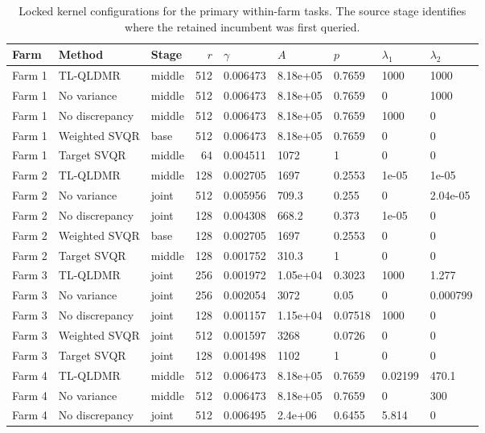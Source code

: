 \begin{table}[pos=t,width=\FullWidth]
\centering
\color{blue}
\caption{Locked kernel configurations for the primary within-farm tasks. The source stage identifies where the retained incumbent was first queried.}
\label{tab:selection-v2-within-kernel-configs}
\small
\setlength{\tabcolsep}{3pt}
\begin{tabular}{lllrlllll}
\toprule
Farm & Method & Stage & $r$ & $\gamma$ & $A$ & $p$ & $\lambda_1$ & $\lambda_2$ \\
\midrule
Farm 1 & TL-QLDMR & middle & 512 & 0.006473 & 8.18e+05 & 0.7659 & 1000 & 1000 \\
Farm 1 & No variance & middle & 512 & 0.006473 & 8.18e+05 & 0.7659 & 0 & 1000 \\
Farm 1 & No discrepancy & middle & 512 & 0.006473 & 8.18e+05 & 0.7659 & 1000 & 0 \\
Farm 1 & Weighted SVQR & base & 512 & 0.006473 & 8.18e+05 & 0.7659 & 0 & 0 \\
Farm 1 & Target SVQR & middle & 64 & 0.004511 & 1072 & 1 & 0 & 0 \\
Farm 2 & TL-QLDMR & middle & 128 & 0.002705 & 1697 & 0.2553 & 1e-05 & 1e-05 \\
Farm 2 & No variance & joint & 512 & 0.005956 & 709.3 & 0.255 & 0 & 2.04e-05 \\
Farm 2 & No discrepancy & joint & 128 & 0.004308 & 668.2 & 0.373 & 1e-05 & 0 \\
Farm 2 & Weighted SVQR & base & 128 & 0.002705 & 1697 & 0.2553 & 0 & 0 \\
Farm 2 & Target SVQR & middle & 128 & 0.001752 & 310.3 & 1 & 0 & 0 \\
Farm 3 & TL-QLDMR & joint & 256 & 0.001972 & 1.05e+04 & 0.3023 & 1000 & 1.277 \\
Farm 3 & No variance & joint & 256 & 0.002054 & 3072 & 0.05 & 0 & 0.000799 \\
Farm 3 & No discrepancy & joint & 128 & 0.001157 & 1.15e+04 & 0.07518 & 1000 & 0 \\
Farm 3 & Weighted SVQR & joint & 512 & 0.001597 & 3268 & 0.0726 & 0 & 0 \\
Farm 3 & Target SVQR & joint & 128 & 0.001498 & 1102 & 1 & 0 & 0 \\
Farm 4 & TL-QLDMR & middle & 512 & 0.006473 & 8.18e+05 & 0.7659 & 0.02199 & 470.1 \\
Farm 4 & No variance & middle & 512 & 0.006473 & 8.18e+05 & 0.7659 & 0 & 300 \\
Farm 4 & No discrepancy & joint & 512 & 0.006495 & 2.4e+06 & 0.6455 & 5.814 & 0 \\

\end{tabular}
\end{table}
